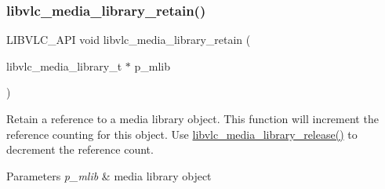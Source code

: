 \subsubsection{\texorpdfstring{libvlc\+\_\+media\+\_\+library\+\_\+retain()}{libvlc\_media\_library\_retain()}}
{\footnotesize\ttfamily L\+I\+B\+V\+L\+C\+\_\+\+A\+PI void libvlc\+\_\+media\+\_\+library\+\_\+retain (\begin{DoxyParamCaption}\item[{libvlc\+\_\+media\+\_\+library\+\_\+t $\ast$}]{p\+\_\+mlib }\end{DoxyParamCaption})}

Retain a reference to a media library object. This function will increment the reference counting for this object. Use \hyperlink{group__libvlc__media__library_ga334af602d7829cd26e6a0591fff5bf6d}{libvlc\+\_\+media\+\_\+library\+\_\+release()} to decrement the reference count.


\begin{DoxyParams}{Parameters}
{\em p\+\_\+mlib} & media library object \\
\hline
\end{DoxyParams}
